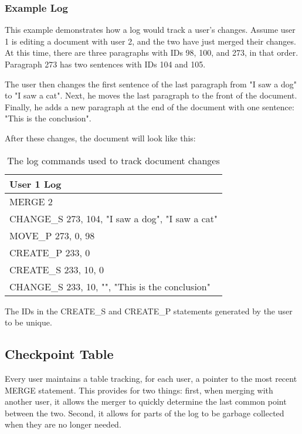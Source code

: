 \subsubsection{Example Log}
This example demonstrates how a log would track a user's changes. Assume user 1 is editing a document
with user 2, and the two have just merged their changes. At this time, there are three paragraphs with IDs 98, 100,
and  273, in that order. Paragraph 273 has two sentences with IDs 104 and 105. 

The user then changes the first sentence of the last paragraph from "I saw a dog" to "I saw a cat". Next, he moves the last
paragraph to the front of the document. Finally, he adds a new paragraph at the end of the document with one sentence:
"This is the conclusion".

After these changes, the document will look like this:

\begin{table}[h!]
\begin{center}
 \begin{tabular} {|l|}
  \hline
   User 1 Log \\
  \hline \hline
   MERGE 2 \\
   CHANGE\_S 273, 104, "I saw a dog", "I saw a cat" \\
   MOVE\_P 273, 0, 98 \\
   CREATE\_P 233, 0 \\
   CREATE\_S 233, 10, 0 \\
   CHANGE\_S 233, 10, "", "This is the conclusion" \\
  \hline
 \end{tabular}
\end{center}
\caption{The log commands used to track document changes}
\label{table:log_commands}
\end{table}

The IDs in the CREATE\_S and CREATE\_P statements generated by the user to be unique.

\subsection{Checkpoint Table}

Every user maintains a table tracking, for each user, a pointer to the most recent MERGE statement.
This provides for two things: first, when merging with another user, it allows the merger
to quickly determine the last common point between the two. Second, it allows for parts
of the log to be garbage collected when they are no longer needed.

